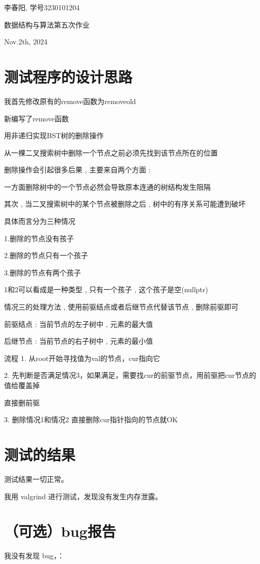 \documentclass[UTF8]{ctexart}
\begin{document}
李春阳, 学号3230101204

{数据结构与算法第五次作业}

Nov.2th, 2024

\section{测试程序的设计思路}

我首先修改原有的remove函数为removeold

新编写了remove函数

用非递归实现BST树的删除操作

从一棵二叉搜索树中删除一个节点之前必须先找到该节点所在的位置

	删除操作会引起很多后果 , 主要来自两个方面 :
    
	一方面删除树中的一个节点必然会导致原本连通的树结构发生阻隔
    
	其次 , 当二叉搜索树中的某个节点被删除之后 , 树中的有序关系可能遭到破坏
    
    具体而言分为三种情况
    
	1.删除的节点没有孩子
    
	2.删除的节点只有一个孩子
    
	3.删除的节点有两个孩子
    
	1和2可以看成是一种类型 , 只有一个孩子 , 这个孩子是空(nullptr)
    
	情况三的处理方法 , 使用前驱结点或者后继节点代替该节点 , 删除前驱即可
    
	前驱结点 : 当前节点的左子树中 , 元素的最大值
    
	后继节点 : 当前节点的右子树中 , 元素的最小值
    
流程
1. 从root开始寻找值为val的节点，cur指向它

2. 先判断是否满足情况3，如果满足，需要找cur的前驱节点，用前驱把cur节点的值给覆盖掉

直接删前驱

3. 删除情况1和情况2   直接删除cur指针指向的节点就OK
\section{测试的结果}

测试结果一切正常。

我用 valgrind 进行测试，发现没有发生内存泄露。

\section{（可选）bug报告}

我没有发现 bug，：
\end{document}
